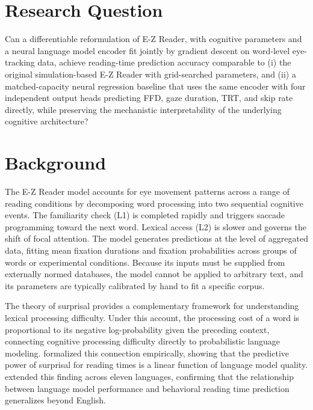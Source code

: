 \documentclass[12pt]{article}
\begin{document}
\section{Research Question}

Can a differentiable reformulation of E-Z Reader, with cognitive parameters
and a neural language model encoder fit jointly by gradient descent on
word-level eye-tracking data, achieve reading-time prediction accuracy
comparable to (i) the original simulation-based E-Z Reader
\citep{reichle1998toward} with grid-searched parameters, and (ii) a
matched-capacity neural regression baseline that uses the same encoder with
four independent output heads predicting FFD, gaze duration, TRT, and skip
rate directly, while preserving the mechanistic interpretability of the
underlying cognitive architecture?

\section{Background}

The E-Z Reader model \citep{reichle1998toward} accounts for eye movement
patterns across a range of reading conditions by decomposing word processing
into two sequential cognitive events. The familiarity check (L1) is completed
rapidly and triggers saccade programming toward the next word. Lexical access
(L2) is slower and governs the shift of focal attention. The model generates
predictions at the level of aggregated data, fitting mean fixation durations
and fixation probabilities across groups of words or experimental conditions.
Because its inputs must be supplied from externally normed databases, the model
cannot be applied to arbitrary text, and its parameters are typically
calibrated by hand to fit a specific corpus.

The theory of surprisal \citep{levy2008expectation} provides a complementary
framework for understanding lexical processing difficulty. Under this account,
the processing cost of a word is proportional to its negative log-probability
given the preceding context, connecting cognitive processing difficulty directly
to probabilistic language modeling. \citet{goodkind2018predictive} formalized
this connection empirically, showing that the predictive power of surprisal for
reading times is a linear function of language model quality.
\citet{wilcox2023testing} extended this finding across eleven languages,
confirming that the relationship between language model performance and
behavioral reading time prediction generalizes beyond English.
\end{document}
